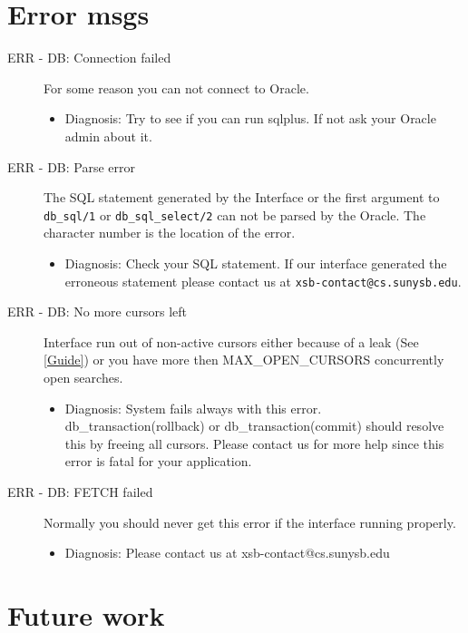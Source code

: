 \section{Error msgs}

\begin{description}
\item[ERR - DB: Connection failed] For some reason you can not connect
	to Oracle.
	\begin{itemize}
	\item	Diagnosis: Try to see if you can run sqlplus.
		If not ask your Oracle admin about it.
	\end{itemize}

\item[ERR - DB: Parse error] The SQL statement generated by the
	Interface or the first argument to {\tt db\_sql/1} or 
	{\tt db\_sql\_select/2} can not be parsed by the Oracle.
	The character number is the location of the error. 
	\begin{itemize}
	\item	Diagnosis: Check your SQL statement.  If our interface
		generated the erroneous statement please contact us at
		{\tt xsb-contact@cs.sunysb.edu}.
	\end{itemize}

\item[ERR - DB: No more cursors left] Interface run out of non-active
cursors either because of a leak (See \ref{Guide}) or you have more then MAX\_OPEN\_CURSORS concurrently open
searches.
\begin{itemize}

\item Diagnosis: System fails always with this error.  db\_transaction(rollback) or
	   db\_transaction(commit) should resolve this by freeing all cursors.
	   Please contact us for more help since this error is fatal for your
	   application.
\end{itemize}

\item[ERR - DB: FETCH failed] Normally you should never get this error if the 
interface running properly.
\begin{itemize}

\item Diagnosis: Please contact us at xsb-contact@cs.sunysb.edu
\end{itemize}

\end{description}


\section{Future work}


